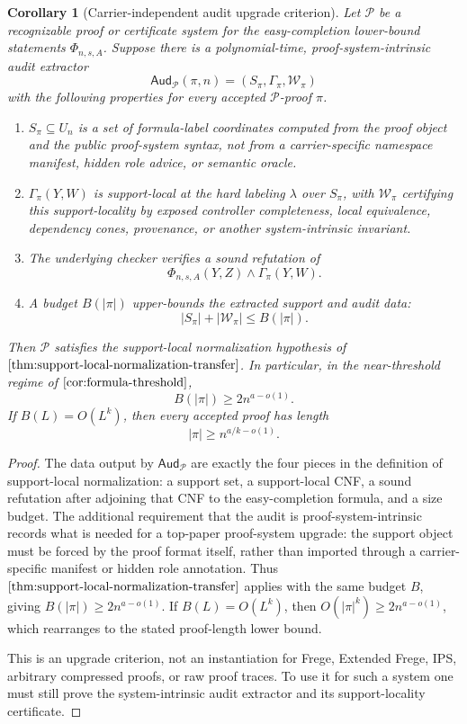 \documentclass[11pt]{article}
\newtheorem{corollary}[theorem]{Corollary}
\theoremstyle{definition}
\begin{document}
\begin{corollary}[Carrier-independent audit upgrade criterion]\label{cor:carrier-independent-audit-upgrade}
Let \(\mathcal P\) be a recognizable proof or certificate system for the
easy-completion lower-bound statements \(\Phi_{n,s,A}\).  Suppose there is a
polynomial-time, proof-system-intrinsic audit extractor
\[
  \mathsf{Aud}_{\mathcal P}(\pi,n)
  =
  (S_\pi,\Gamma_\pi,\mathcal W_\pi)
\]
with the following properties for every accepted \(\mathcal P\)-proof \(\pi\).
\begin{enumerate}[label=(\roman*)]
  \item \(S_\pi\subseteq U_n\) is a set of formula-label coordinates computed
  from the proof object and the public proof-system syntax, not from a
  carrier-specific namespace manifest, hidden role advice, or semantic oracle.
  \item \(\Gamma_\pi(Y,W)\) is support-local at the hard labeling \(\lambda\)
  over \(S_\pi\), with \(\mathcal W_\pi\) certifying this support-locality by
  exposed controller completeness, local equivalence, dependency cones,
  provenance, or another system-intrinsic invariant.
  \item The underlying checker verifies a sound refutation of
  \[
    \Phi_{n,s,A}(Y,Z)\wedge\Gamma_\pi(Y,W).
  \]
  \item A budget \(B(|\pi|)\) upper-bounds the extracted support and audit
  data:
  \[
    |S_\pi|+|\mathcal W_\pi|\le B(|\pi|).
  \]
\end{enumerate}
Then \(\mathcal P\) satisfies the support-local normalization hypothesis of
\(\Cref{thm:support-local-normalization-transfer}\).  In particular, in the
near-threshold regime of \(\Cref{cor:formula-threshold}\),
\[
  B(|\pi|)\ge 2n^{a-o(1)}.
\]
If \(B(L)=O(L^k)\), then every accepted proof has length
\[
  |\pi|\ge n^{a/k-o(1)}.
\]
\end{corollary}

\begin{proof}
The data output by \(\mathsf{Aud}_{\mathcal P}\) are exactly the four pieces in
the definition of support-local normalization: a support set, a support-local
CNF, a sound refutation after adjoining that CNF to the easy-completion
formula, and a size budget.  The additional requirement that the audit is
proof-system-intrinsic records what is needed for a top-paper proof-system
upgrade: the support object must be forced by the proof format itself, rather
than imported through a carrier-specific manifest or hidden role annotation.
Thus \(\Cref{thm:support-local-normalization-transfer}\) applies with the same
budget \(B\), giving \(B(|\pi|)\ge 2n^{a-o(1)}\).  If \(B(L)=O(L^k)\), then
\(O(|\pi|^k)\ge 2n^{a-o(1)}\), which rearranges to the stated proof-length
lower bound.

This is an upgrade criterion, not an instantiation for Frege, Extended Frege,
IPS, arbitrary compressed proofs, or raw proof traces.  To use it for such a
system one must still prove the system-intrinsic audit extractor and its
support-locality certificate.
\end{proof}
\end{document}
